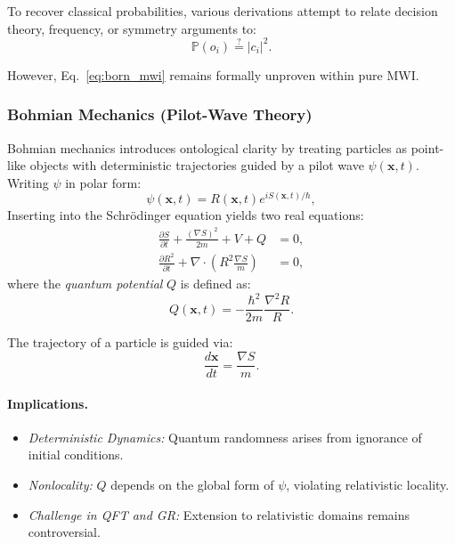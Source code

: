 \documentclass[12pt]{article}
\begin{document}
To recover classical probabilities, various derivations attempt to relate decision theory, frequency, or symmetry arguments to:
\begin{equation}
\mathbb{P}(o_i) \stackrel{?}{=} |c_i|^2. \label{eq:born_mwi}
\end{equation}

However, Eq.~\eqref{eq:born_mwi} remains formally unproven within pure MWI.

\subsubsection*{Bohmian Mechanics (Pilot-Wave Theory)}

Bohmian mechanics introduces ontological clarity by treating particles as point-like objects with deterministic trajectories guided by a pilot wave $\psi(\mathbf{x}, t)$. Writing $\psi$ in polar form:
\begin{equation}
\psi(\mathbf{x}, t) = R(\mathbf{x}, t) e^{i S(\mathbf{x}, t)/\hbar}, \label{eq:polar_bohm}
\end{equation}
Inserting into the Schrödinger equation yields two real equations:
\begin{align}
\frac{\partial S}{\partial t} + \frac{(\nabla S)^2}{2m} + V + Q &= 0, \label{eq:bohm_hj}\\
\frac{\partial R^2}{\partial t} + \nabla \cdot \left( R^2 \frac{\nabla S}{m} \right) &= 0, \label{eq:bohm_continuity}
\end{align}
where the \emph{quantum potential} $Q$ is defined as:
\begin{equation}
Q(\mathbf{x}, t) = -\frac{\hbar^2}{2m} \frac{\nabla^2 R}{R}. \label{eq:quantum_potential}
\end{equation}

The trajectory of a particle is guided via:
\begin{equation}
\frac{d\mathbf{x}}{dt} = \frac{\nabla S}{m}. \label{eq:bohm_velocity_revised}
\end{equation}

\paragraph{Implications.}
\begin{itemize}
    \item \emph{Deterministic Dynamics:} Quantum randomness arises from ignorance of initial conditions.
    \item \emph{Nonlocality:} $Q$ depends on the global form of $\psi$, violating relativistic locality.
    \item \emph{Challenge in QFT and GR:} Extension to relativistic domains remains controversial.
\end{itemize}
\end{document}
